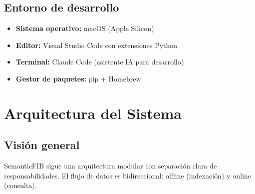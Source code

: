 \documentclass[12pt, a4paper, twoside]{report}
\begin{document}
\section{Entorno de desarrollo}

\begin{itemize}
  \item \textbf{Sistema operativo:} macOS (Apple Silicon)
  \item \textbf{Editor:} Visual Studio Code con extensiones Python
  \item \textbf{Terminal:} Claude Code (asistente IA para desarrollo)
  \item \textbf{Gestor de paquetes:} pip + Homebrew
\end{itemize}


\chapter{Arquitectura del Sistema}
\label{ch:arquitectura}

\section{Visi\'on general}

SemanticFIB sigue una arquitectura modular con separaci\'on clara de responsabilidades. El flujo de datos es bidireccional: offline (indexaci\'on) y online (consulta).
\end{document}
